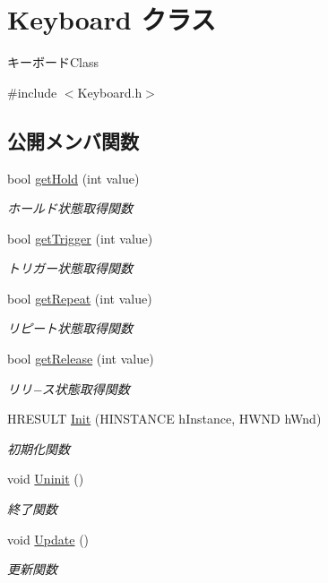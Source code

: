 \hypertarget{class_keyboard}{}\section{Keyboard クラス}
\label{class_keyboard}


キーボード\+Class  




{\ttfamily \#include $<$Keyboard.\+h$>$}

\subsection*{公開メンバ関数}
\begin{DoxyCompactItemize}
\item 
bool \mbox{\hyperlink{class_keyboard_a7dd4b44882383870bb1923065ca0fdfb}{get\+Hold}} (int value)
\begin{DoxyCompactList}\small\item\em ホールド状態取得関数 \end{DoxyCompactList}\item 
bool \mbox{\hyperlink{class_keyboard_a74cad384c6592d1db0c3a8a50ae9ff9e}{get\+Trigger}} (int value)
\begin{DoxyCompactList}\small\item\em トリガー状態取得関数 \end{DoxyCompactList}\item 
bool \mbox{\hyperlink{class_keyboard_aafeebcebd37ed0652a52b40c43c15a3b}{get\+Repeat}} (int value)
\begin{DoxyCompactList}\small\item\em リピート状態取得関数 \end{DoxyCompactList}\item 
bool \mbox{\hyperlink{class_keyboard_a03fa7ef22c90afaad27fc79fd1d7235c}{get\+Release}} (int value)
\begin{DoxyCompactList}\small\item\em リリ−ス状態取得関数 \end{DoxyCompactList}\item 
H\+R\+E\+S\+U\+LT \mbox{\hyperlink{class_keyboard_a5de6d3cc2a2a6ac69945f7075d58547d}{Init}} (H\+I\+N\+S\+T\+A\+N\+CE h\+Instance, H\+W\+ND h\+Wnd)
\begin{DoxyCompactList}\small\item\em 初期化関数 \end{DoxyCompactList}\item 
void \mbox{\hyperlink{class_keyboard_aeeed458a75ddc291f6742d317a99766d}{Uninit}} ()
\begin{DoxyCompactList}\small\item\em 終了関数 \end{DoxyCompactList}\item 
void \mbox{\hyperlink{class_keyboard_a071313d0ae6538e9307ff6a059aa9197}{Update}} ()
\begin{DoxyCompactList}\small\item\em 更新関数 \end{DoxyCompactList}\end{DoxyCompactItemize}
